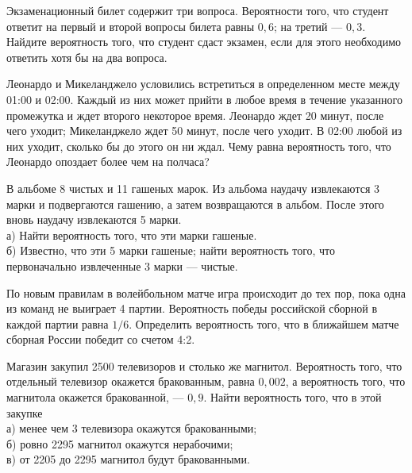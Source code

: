 \newpage\setcounter{zad}{0}



\begin{zkrW}{20}\noindent 
	Экзаменационный билет содержит три вопроса. Вероятности того, что студент ответит на первый и второй вопросы билета равны $0{,}6$; на третий --- $0{,}3$. Найдите вероятность того, что студент сдаст экзамен, если для этого необходимо ответить хотя бы на два вопроса.
 
\end{zkrW}

\begin{zkrW}{20}\noindent 
	Леонардо и Микеланджело условились встретиться в определенном месте между 01:00 и 02:00. Каждый из них может прийти в любое время в течение указанного промежутка и ждет второго некоторое время. Леонардо ждет 20 минут, после чего уходит; Микеланджело ждет 50 минут, после чего уходит. В 02:00 любой из них уходит, сколько бы до этого он ни ждал. Чему равна вероятность того, что Леонардо опоздает более чем на полчаса?
 
\end{zkrW}

\begin{zkrW}{20}\noindent 
	В альбоме 8 чистых и 11 гашеных марок. Из альбома наудачу извлекаются 3 марки и подвергаются гашению, а затем возвращаются в альбом. После этого вновь наудачу извлекаются 5 марки. \\ \indent а) Найти вероятность того, что эти марки гашеные. \\ \indent б) Известно, что эти 5 марки гашеные; найти вероятность того, что первоначально извлеченные 3 марки --- чистые.
 
\end{zkrW}

\begin{zkrW}{20}\noindent 
	По новым правилам в волейбольном матче игра происходит до тех пор, пока одна из команд не выиграет 4 партии. Вероятность победы российской сборной в каждой партии равна $1/6$. Определить вероятность того, что в ближайшем матче сборная России победит со счетом 4:2.
 
\end{zkrW}

\begin{zkrW}{20}\noindent 
	Магазин закупил 2500 телевизоров и столько же магнитол. Вероятность того, что отдельный телевизор окажется бракованным, равна $0{,}002$, а вероятность того, что магнитола окажется бракованной, --- $0{,}9$. Найти вероятность того, что в этой закупке \\ \indent а) менее чем 3 телевизора окажутся бракованными; \\ \indent б) ровно 2295 магнитол окажутся нерабочими; \\ \indent в) от 2205 до 2295 магнитол будут бракованными.
 
\end{zkrW}

